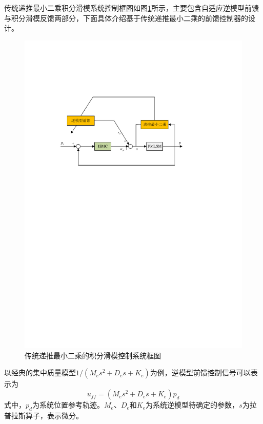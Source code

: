 传统递推最小二乘积分滑模系统控制框图如图\ref{传统RLS}所示，主要包含自适应逆模型前馈与积分滑模反馈两部分，下面具体介绍基于传统递推最小二乘的前馈控制器的设计。
\\
\begin{figure}[H]
	\centering
	\includegraphics[width=12cm]{figures/RLSISMC2.pdf}
	\caption{传统递推最小二乘的积分滑模控制系统框图}
	\label{传统RLS}
\end{figure}


以经典的集中质量模型$1/(M_es^2+D_es+K_e)$为例，逆模型前馈控制信号可以表示为
\begin{equation}
\label{传统逆模型前馈}
u_{ff}=(M_es^2+D_es+K_e)p_d
\end{equation}
式中，$p_d$为系统位置参考轨迹。$M_e$、$D_e$和$K_e$为系统逆模型待确定的参数，$s$为拉普拉斯算子，表示微分。

